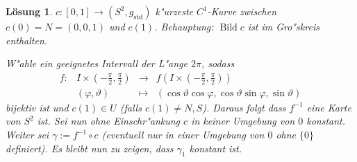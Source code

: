 \documentclass[paper=A4, twoside, chapterprefix=true, bibliography=totoc, headsepline]{scrbook}
\let\temp\phi
\let\phi\varphi
\let\varphi\temp
\let\temp\theta
\let\theta\vartheta
\let\vartheta\temp
\let\temp\epsilon
\let\epsilon\varepsilon
\let\varepsilon\temp
\let\temp\rho
\let\rho\varrho
\let\varrho\temp
\DeclareMathOperator{\Bild}{Bild}
\newcommand{\X}{\times}
\theoremstyle{plain}
\theoremstyle{nonumberplain}
\theoremstyle{empty}
\theoremstyle{break}
\newtheorem{Loes}{L\"osung}
\begin{document}
\begin{Loes}
$c: [0,1] \to (S^2, g_{\text{std}})$ k"urzeste $C^1$-Kurve zwischen $c(0) = N = (0,0,1)$ und $c(1)$. \emph{Behauptung:} $\Bild c$ ist im Gro"skreis enthalten.

W"ahle ein geeignetes Intervall der L"ange $2 \pi$, sodass
	\[\begin{array}{cccc} f: & I \X \left( -\frac{\pi}{2}, \frac{\pi}{2} \right) &\to& f \left( I \X \left( -\frac{\pi}{2}, \frac{\pi}{2} \right) \right)\\
		& (\phi, \theta) &\mapsto& (\cos\theta \cos\phi, \cos\theta\sin\phi, \sin\theta)\end{array}\]
bijektiv ist und $c(1) \in U$ (falls $c(1) \ne N,S$). Daraus folgt dass $f^{-1}$ eine Karte von $S^2$ ist. Sei nun ohne Einschr"ankung $c$ in keiner Umgebung von $0$ konstant. Weiter sei $\gamma := f^{-1} \circ c$ (eventuell nur in einer Umgebung von $0$ ohne $\{0\}$ definiert). Es bleibt nun zu zeigen, dass $\gamma_1$ konstant ist.


\end{Loes}
\end{document}
